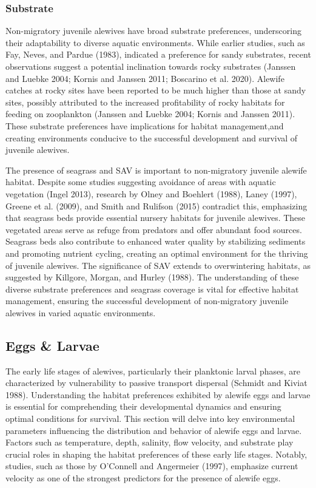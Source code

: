 \documentclass[
]{book}
\begin{document}
\hypertarget{substrate-1}{%
\subsubsection{Substrate}\label{substrate-1}}

Non-migratory juvenile alewives have broad substrate preferences, underscoring their adaptability to diverse aquatic environments. While earlier studies, such as Fay, Neves, and Pardue (1983), indicated a preference for sandy substrates, recent observations suggest a potential inclination towards rocky substrates (Janssen and Luebke 2004; Kornis and Janssen 2011; Boscarino et al. 2020). Alewife catches at rocky sites have been reported to be much higher than those at sandy sites, possibly attributed to the increased profitability of rocky habitats for feeding on zooplankton (Janssen and Luebke 2004; Kornis and Janssen 2011). These substrate preferences have implications for habitat management,and creating environments conducive to the successful development and survival of juvenile alewives.

The presence of seagrass and SAV is important to non-migratory juvenile alewife habitat. Despite some studies suggesting avoidance of areas with aquatic vegetation (Ingel 2013), research by Olney and Boehlert (1988), Laney (1997), Greene et al. (2009), and Smith and Rulifson (2015) contradict this, emphasizing that seagrass beds provide essential nursery habitats for juvenile alewives. These vegetated areas serve as refuge from predators and offer abundant food sources. Seagrass beds also contribute to enhanced water quality by stabilizing sediments and promoting nutrient cycling, creating an optimal environment for the thriving of juvenile alewives. The significance of SAV extends to overwintering habitats, as suggested by Killgore, Morgan, and Hurley (1988). The understanding of these diverse substrate preferences and seagrass coverage is vital for effective habitat management, ensuring the successful development of non-migratory juvenile alewives in varied aquatic environments.

\hypertarget{eggs-larvae}{%
\subsection{Eggs \& Larvae}\label{eggs-larvae}}

The early life stages of alewives, particularly their planktonic larval phases, are characterized by vulnerability to passive transport dispersal (Schmidt and Kiviat 1988). Understanding the habitat preferences exhibited by alewife eggs and larvae is essential for comprehending their developmental dynamics and ensuring optimal conditions for survival. This section will delve into key environmental parameters influencing the distribution and behavior of alewife eggs and larvae. Factors such as temperature, depth, salinity, flow velocity, and substrate play crucial roles in shaping the habitat preferences of these early life stages. Notably, studies, such as those by O'Connell and Angermeier (1997), emphasize current velocity as one of the strongest predictors for the presence of alewife eggs.
\end{document}
